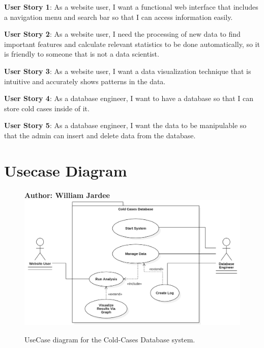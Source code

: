\documentclass[11pt]{article}
\begin{document}
\noindent\textbf{\hypertarget{us1}{User Story 1}}:  As a website user, I want a functional web interface that includes a navigation menu and search bar so that I can access information easily.\vspace{0.5em}

\noindent\textbf{\hypertarget{us2}{User Story 2}}: As a website user, I need the processing of new data to find important features and calculate relevant statistics to be done automatically, so it is friendly to someone that is not a data scientist.\vspace{0.5em}

\noindent\textbf{\hypertarget{us3}{User Story 3}}: As a website user, I want a data visualization technique that is intuitive and accurately shows patterns in the data.\vspace{0.5em}

\noindent\textbf{\hypertarget{us4}{User Story 4}}: As a database engineer, I want to have a database so that I can store cold cases inside of it. \vspace{0.5em}

\noindent\textbf{\hypertarget{us5}{User Story 5}}: As a database engineer, I want the data to be manipulable so that the admin can insert and delete data from the database.\vspace{0.5em}

\clearpage



\section{Usecase Diagram}

\begin{figure}[!ht]
\centering
\textbf{Author: William Jardee}
	\includegraphics[width=.95\textwidth]{./UseCases/jardee_usecase}\\
	\caption{UseCase diagram for the Cold-Cases Database system.}
	\label{fig:usecase_diagram}
\end{figure}
\clearpage
\end{document}

